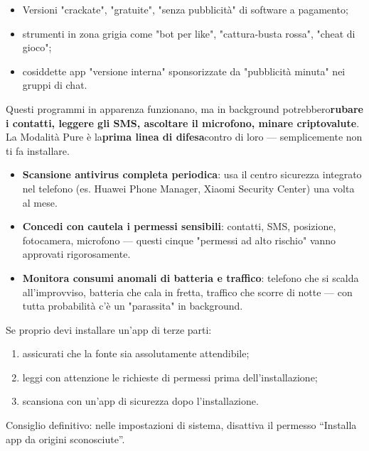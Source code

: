 \begin{itemize}
  \item Versioni "crackate", "gratuite", "senza pubblicità" di software a pagamento;
  \item strumenti in zona grigia come "bot per like", "cattura-busta rossa", "cheat di gioco";
  \item cosiddette app "versione interna" sponsorizzate da "pubblicità minuta" nei gruppi di chat.
\end{itemize}

Questi programmi in apparenza funzionano, ma in background potrebbero\textbf{rubare i contatti, leggere gli SMS, ascoltare il microfono, minare criptovalute}. La Modalità Pure è la\textbf{prima linea di difesa}contro di loro — semplicemente non ti fa installare.


\begin{itemize}
  \item \textbf{Scansione antivirus completa periodica}: usa il centro sicurezza integrato nel telefono (es. Huawei Phone Manager, Xiaomi Security Center) una volta al mese.
  \item \textbf{Concedi con cautela i permessi sensibili}: contatti, SMS, posizione, fotocamera, microfono — questi cinque "permessi ad alto rischio" vanno approvati rigorosamente.
  \item \textbf{Monitora consumi anomali di batteria e traffico}: telefono che si scalda all'improvviso, batteria che cala in fretta, traffico che scorre di notte — con tutta probabilità c'è un "parassita" in background.
\end{itemize}

Se proprio devi installare un'app di terze parti:

\begin{enumerate}
  \item assicurati che la fonte sia assolutamente attendibile;
  \item leggi con attenzione le richieste di permessi prima dell'installazione;
  \item scansiona con un'app di sicurezza dopo l'installazione.
\end{enumerate}

Consiglio definitivo: nelle impostazioni di sistema, disattiva il permesso “Installa app da origini sconosciute”.


